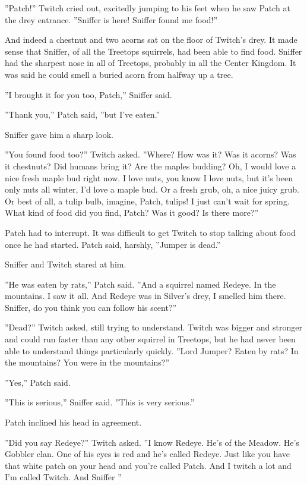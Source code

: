 \documentclass[12pt]{book}
\begin{document}
''Patch!'' Twitch cried out, excitedly jumping to his feet when he saw Patch at the drey entrance. ''Sniffer is here! Sniffer found me food!''

And indeed a chestnut and two acorns sat on the floor of Twitch's drey. It made sense that Sniffer, of all the Treetops squirrels, had been able to find food. Sniffer had the sharpest nose in all of Treetops, probably in all the Center Kingdom. It was said he could smell a buried acorn from halfway up a tree.

''I brought it for you too, Patch,'' Sniffer said.

''Thank you,'' Patch said, ''but I've eaten.''

Sniffer gave him a sharp look.

''You found food too?'' Twitch asked. ''Where? How was it? Was it acorns? Was it chestnuts? Did humans bring it? Are the maples budding? Oh, I would love a nice fresh maple bud right now. I love nuts, you know I love nuts, but it's been only nuts all winter, I'd love a maple bud. Or a fresh grub, oh, a nice juicy grub. Or best of all, a tulip bulb, imagine, Patch, tulips! I just can't wait for spring. What kind of food did you find, Patch? Was it good? Is there more?''

Patch had to interrupt. It was difficult to get Twitch to stop talking about food once he had started. Patch said, harshly, ''Jumper is dead.''

Sniffer and Twitch stared at him.

''He was eaten by rats,'' Patch said. ''And a squirrel named Redeye. In the mountains. I saw it all. And Redeye was in Silver's drey, I smelled him there. Sniffer, do you think you can follow his scent?''

''Dead?'' Twitch asked, still trying to understand. Twitch was bigger and stronger and could run faster than any other squirrel in Treetops, but he had never been able to understand things particularly quickly. ''Lord Jumper? Eaten by rats? In the mountains? You were in the mountains?''

''Yes,'' Patch said.

''This is serious,'' Sniffer said. ''This is very serious.''

Patch inclined his head in agreement.

''Did you say Redeye?'' Twitch asked. ''I know Redeye. He's of the Meadow. He's Gobbler clan. One of his eyes is red and he's called Redeye. Just like you have that white patch on your head and you're called Patch. And I twitch a lot and I'm called Twitch. And Sniffer %
''
\end{document}
